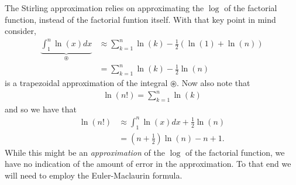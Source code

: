 The Stirling approximation relies on approximating the $ \log $ of the factorial function, instead of the factorial funtion itself.
With that key point in mind consider,
\begin{align}
    \underbrace{\int_1^n \ln(x)dx}_{\circledast} &\approx \sum_{k=1}^{n} \ln(k) - \frac{1}{2}\left( \ln(1) + \ln(n)\right) \\
    &= \sum_{k=1}^n \ln(k) - \frac{1}{2}\ln(n)
\end{align}
is a trapezoidal approximation of the integral $ \circledast $. Now also note that
\begin{align}
    \ln(n!) = \sum_{k=1}^n \ln(k)
\end{align} 
and so we have that
\begin{align}
    \label{eq:stirling_1}
    \ln(n!) &\approx \int_1^n \ln(x) dx + \frac{1}{2} \ln(n) \\
        &= \left(n + \frac{1}{2}\right)\ln(n) - n + 1.
\end{align}
While this might be an \emph{approximation} of the $ \log $ of the factorial function, we have no indication of the amount of error in the approximation. To that end we will need to employ the Euler-Maclaurin formula.

